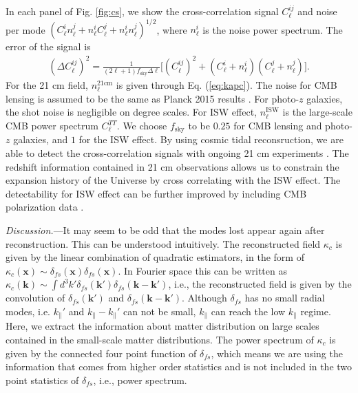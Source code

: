 \documentclass[aps,prl,twocolumn,showpacs,superscriptaddress,groupedaddress,nofootinbib,floatfix]{revtex4}  %
\newcommand{\mr}{\mathrm}
\begin{document}
In each panel of Fig. \ref{fig:cs}, we show the cross-correlation signal 
$C_\ell^{ij}$ and noise per mode
$(C_\ell^in_\ell^j+n_\ell^iC_\ell^j+n^i_\ell n^j_\ell)^{1/2}$, where $n_\ell^i$
is the noise power spectrum. The error of the signal is 
\begin{eqnarray}
(\Delta C_\ell^{ij})^2=\frac{1}{(2\ell+1)f_\mr{sky}\Delta\ell}
\bigg[{(C_\ell^{ij})^2+(C_\ell^{i}+n_\ell^{i})
(C_\ell^{j}+n_\ell^{j})}\bigg].
\end{eqnarray}
For the 21 cm field, $n_\ell^\mr{21cm}$ is given through Eq. (\ref{eq:kapc}). 
The noise for CMB lensing is assumed to be the same as Planck 2015 results 
\cite{2015:plancklensing}. For photo-$z$ galaxies, the shot noise is negligible
on degree scales. For ISW effect, $n_\ell^\mr{ISW}$ is the large-scale
CMB power spectrum $C_\ell^{TT}$. We choose $f_\mr{sky}$ to be $0.25$ for 
CMB lensing and photo-$z$ galaxies, and $1$ for the ISW effect. By
using cosmic tidal reconsruction, we are able to detect the cross-correlation
signals with ongoing 21 cm experiments \cite{2014SPIE.9145E..22B,2015ApJ...798...40X,HIRAX}. 
The redshift information contained in 21 cm observations allows us to constrain
the expansion history of the Universe by cross correlating with the ISW effect.
The detectability for ISW effect can be further improved by including CMB 
polarization data \cite{2011PhRvD..83f3001L}.

{\it Discussion.}---It may seem to be odd that the modes lost appear again
after reconstruction. This can be understood intuitively.
The reconstructed field $\kappa_c$ is given by the linear combination of 
quadratic estimators, in the form of 
$\kappa_c(\bm{x})\sim\delta_{fs}(\bm{x})\delta_{fs}(\bm{x})$. In Fourier 
space this can be written as $\kappa_c(\bm{k})\sim\int d^3k'
\delta_{fs}(\bm{k}')\delta_{fs}(\bm{k}-\bm{k}')$, i.e., the reconstructed 
field is given by the convolution of $\delta_{fs}(\bm{k}')$ and 
$\delta_{fs}(\bm{k}-\bm{k}')$. Although $\delta_{fs}$ has no small radial
modes, i.e. $k_{\parallel}'$ and $k_\parallel-k_{\parallel}'$ can not be small,
$k_\parallel$ can reach the low $k_\parallel$ regime.
Here, we extract the information about matter distribution on large scales 
contained in the small-scale matter distributions. The power spectrum of 
$\kappa_c$ is given by the connected four point function of $\delta_{fs}$,
which means we are using the information that comes from higher order statistics
and is not included in the two point statistics of $\delta_{fs}$, i.e., 
power spectrum.
\end{document}

